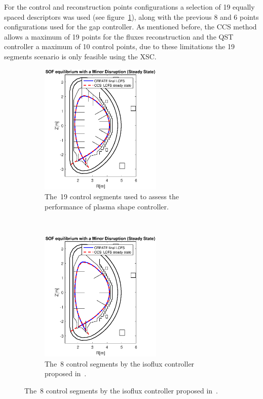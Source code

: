 For the control and reconstruction points configurations a selection of 19 equally spaced descriptors was used (see figure~\ref{19gaps_isoflux}),  along with the previous 8 and 6 points configurations used for the gap controller. As mentioned before, the CCS method allows a maximum of 19 points for the fluxes reconstruction and the QST controller a maximum of 10 control points, due to these  limitations the 19 segments scenario is only  feasible using the XSC.
\smallskip


\begin{figure}[h]
	\centering
	\begin{subfigure}[b]{0.32\textwidth}
		\includegraphics[trim={2.3cm 0cm 2.3cm 0.8cm},clip,height=6.30cm] {Chp3/19_gaps_mnr_disrp_SS_comp.eps}  
		\caption{The~19 control segments used to assess the performance of plasma shape controller.\label{19gaps_isoflux} }
	\end{subfigure}
	~
	\begin{subfigure}[b]{0.32\textwidth}
		\includegraphics[trim={2.3cm 0cm 2.3cm 0.8cm},clip,height=6.30cm]{Chp3/8_gaps_mnr_disrp_SS_comp.eps} 
		\caption{  The~8 control segments by the isoflux controller proposed in~\cite{miyata2013study}. \label{8gaps_isoflux}}

\end{subfigure}
\end{figure}

